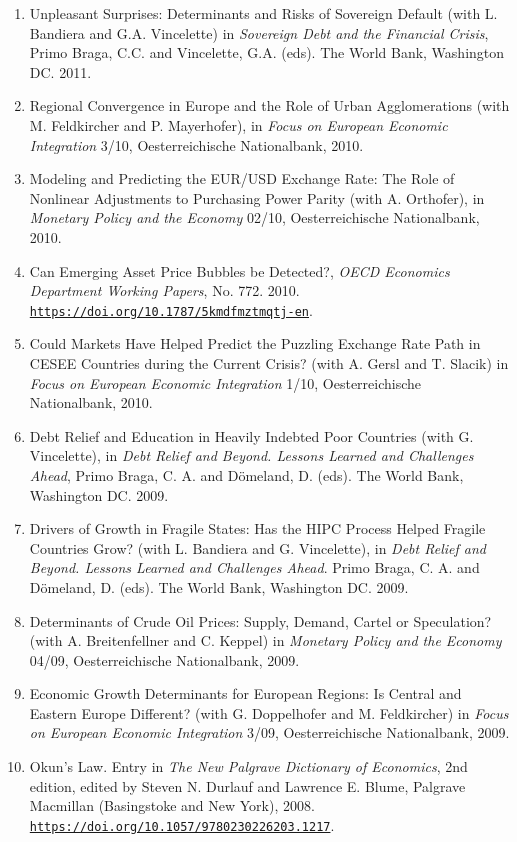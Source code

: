 \documentclass[10pt]{res} %
\newcommand{\doiurl}[1]{\href{https://doi.org/#1}{\nolinkurl{https://doi.org/#1}}}
\begin{document}
\begin{resume}
\begin{enumerate}
\item Unpleasant Surprises: Determinants and Risks of Sovereign Default (with L. Bandiera and G.A. Vincelette) in \textit{Sovereign Debt and the Financial Crisis}, Primo Braga, C.C. and Vincelette, G.A. (eds). The World Bank, Washington DC. 2011.
\item Regional Convergence in Europe and the Role of Urban Agglomerations (with M. Feldkircher and P. Mayerhofer), in \textit{Focus on European Economic Integration} 3/10, Oesterreichische Nationalbank, 2010.
\item Modeling and Predicting the EUR/USD Exchange Rate: The Role of Nonlinear Adjustments to Purchasing Power Parity (with A. Orthofer), in \textit{Monetary Policy and the Economy} 02/10, Oesterreichische Nationalbank, 2010.
\item Can Emerging Asset Price Bubbles be Detected?, \textit{OECD Economics Department Working Papers}, No. 772. 2010. \doiurl{10.1787/5kmdfmztmqtj-en}.
\item Could Markets Have Helped Predict the Puzzling Exchange Rate Path in CESEE Countries during the Current Crisis? (with A. Gersl and T. Slacik) in \textit{Focus on European Economic Integration} 1/10, Oesterreichische Nationalbank, 2010.
\item Debt Relief and Education in Heavily Indebted Poor Countries (with G. Vincelette), in \textit{Debt Relief and Beyond. Lessons Learned and Challenges Ahead}, Primo Braga, C. A. and D\"omeland, D. (eds). The World Bank, Washington DC. 2009.
\item Drivers of Growth in Fragile States: Has the HIPC Process Helped Fragile Countries Grow? (with L. Bandiera and G. Vincelette), in \textit{Debt Relief and Beyond. Lessons Learned and Challenges Ahead}. Primo Braga, C. A. and D\"omeland, D. (eds). The World Bank, Washington DC. 2009.
\item Determinants of Crude Oil Prices: Supply, Demand, Cartel or Speculation? (with A. Breitenfellner and C. Keppel) in \textit{Monetary Policy and the Economy} 04/09, Oesterreichische Nationalbank, 2009.
\item Economic Growth Determinants for European Regions: Is Central and Eastern Europe Different? (with G. Doppelhofer and M. Feldkircher) in \textit{Focus on European Economic Integration} 3/09, Oesterreichische Nationalbank, 2009.
\item Okun's Law. Entry in \textit{The New Palgrave Dictionary of Economics}, 2nd edition, edited by Steven N. Durlauf and Lawrence E. Blume, Palgrave Macmillan (Basingstoke and New York), 2008. \doiurl{10.1057/9780230226203.1217}.

\end{enumerate}
\end{resume}
\end{document}
